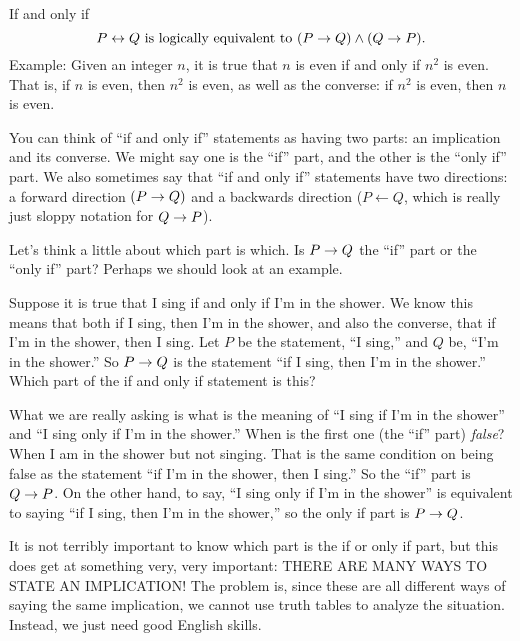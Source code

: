 \documentclass[12pt]{article}
\begin{document}
\begin{defbox}{If and only if}
\[ P \leftrightarrow Q \mbox{ is logically equivalent to } (P \rightarrow Q) \wedge (Q \rightarrow P).\]
Example: Given an integer $n$, it is true that $n$ is even if and only if $n^2$ is even.  That is, if $n$ is even, then $n^2$ is even, as well as the converse: if $n^2$ is even, then $n$ is even.
\end{defbox}

You can think of ``if and only if'' statements as having two parts: an implication and its converse.  We might say one is the ``if'' part, and the other is the ``only if'' part.  We also sometimes say that ``if and only if'' statements have two directions: a forward direction $(P \rightarrow Q)$ and a backwards direction ($P \leftarrow Q$, which is really just sloppy notation for $Q \rightarrow P$).

Let's think a little about which part is which.  Is $P \rightarrow Q$ the ``if'' part or the ``only if'' part?  Perhaps we should look at an example.

\begin{example}
 Suppose it is true that I sing if and only if I'm in the shower.  We know this means that both if I sing, then I'm in the shower, and also the converse, that if I'm in the shower, then I sing.  Let $P$ be the statement, ``I sing,'' and $Q$ be, ``I'm in the shower.''  So $P \rightarrow Q$ is the statement ``if I sing, then I'm in the shower.''  Which part of the if and only if statement is this?

 What we are really asking is what is the meaning of ``I sing if I'm in the shower'' and ``I sing only if I'm in the shower.''  When is the first one (the ``if'' part) {\em false}?  When I am in the shower but not singing.  That is the same condition on being false as the statement ``if I'm in the shower, then I sing.''  So the ``if'' part is $Q \rightarrow P$.  On the other hand, to say, ``I sing only if I'm in the shower'' is equivalent to saying ``if I sing, then I'm in the shower,'' so the only if part is $P \rightarrow Q$.
\end{example}

It is not terribly important to know which part is the if or only if part, but this does get at something very, very important: THERE ARE MANY WAYS TO STATE AN IMPLICATION!  The problem is, since these are all different ways of saying the same implication, we cannot use truth tables to analyze the situation.  Instead, we just need good English skills.
\end{document}
